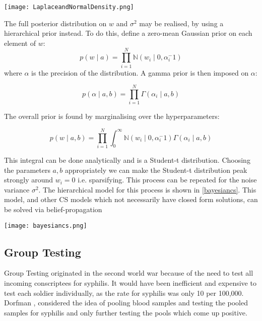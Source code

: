 \begin{figure*}[h]
\centering
\texttt{[image: LaplaceandNormalDensity.png]}
\caption{The Laplace (\(l_1\)-norm, bold line) and Normal (\(l_2\)-norm, dotted line) densities. Note that the Laplace density is sparsity promoting as it penalises solutions away from zero more than the Gaussian density. \cite{Tibshirani1996}}
\label{laplacenormal}
\end{figure*}

The full posterior distribution on \(w\) and \(\sigma^2\) may be realised, by using a hierarchical prior instead. To do this, define a zero-mean Gaussian prior on each element of \(w\):
%
\begin{equation}
p\left(w\mid a\right) = \prod_{i=1}^{N}\mathbb{N}\left(w_i\mid 0, \alpha_{i}^-1\right)
\end{equation}
%
where \(\alpha\) is the precision of the distribution. A gamma prior is then imposed on \(\alpha\):

\begin{equation}
p\left(\alpha \mid a, b \right) = \prod_{i=1}^{N} \Gamma\left( \alpha_i \mid a, b \right)
\end{equation}

The overall prior is found by marginalising over the hyperparameters:

\begin{equation}
p\left( w \mid a, b \right) = \prod_{i=1}^{N} \int_{0}^{\infty} \mathbb{N}\left(w_i\mid 0, \alpha_{i}^-1\right) \Gamma\left( \alpha_i \mid a, b \right)
\end{equation}

This integral can be done analytically and is a Student-t distribution. Choosing the parameters \(a,b\) appropriately we can make the Student-t distribution peak strongly around \(w_i = 0\) i.e. sparsifying. This process can be repeated for the noise variance \(\sigma^2\). The hierarchical model for this process is shown in \ref{bayesiancs}. This model, and other CS models which not necessarily have closed form solutions, can be solved via belief-propagation \cite{Baron2010}

\begin{figure*}[h]
\centering
\texttt{[image: bayesiancs.png]}
\caption{The hierarchical model for the Bayesian CS formulation \cite{Ji2008}}
\label{bayesiancs}
\end{figure*}

\subsection{Group Testing}
Group Testing originated in the second world war because of the need to test all incoming conscriptees for syphilis. It would have been inefficient and expensive to test each soldier individually, as the rate for syphilis was only 10 per 100,000. Dorfman \cite{Dorfman1943}, considered the idea of pooling blood samples and testing the pooled samples for syphilis and only further testing the pools which come up positive.

